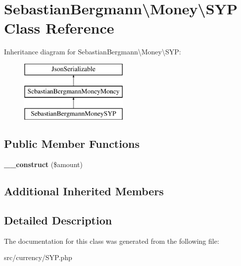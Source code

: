 \hypertarget{classSebastianBergmann_1_1Money_1_1SYP}{}\section{Sebastian\+Bergmann\textbackslash{}Money\textbackslash{}S\+Y\+P Class Reference}
\label{classSebastianBergmann_1_1Money_1_1SYP}
Inheritance diagram for Sebastian\+Bergmann\textbackslash{}Money\textbackslash{}S\+Y\+P\+:\begin{figure}[H]
\begin{center}
\leavevmode
\includegraphics[height=3.000000cm]{classSebastianBergmann_1_1Money_1_1SYP}
\end{center}
\end{figure}
\subsection*{Public Member Functions}
\begin{DoxyCompactItemize}
\item 
\hypertarget{classSebastianBergmann_1_1Money_1_1SYP_a14f6201e1a7a45c086bd21a809c0aa9c}{}{\bfseries \+\_\+\+\_\+construct} (\$amount)\label{classSebastianBergmann_1_1Money_1_1SYP_a14f6201e1a7a45c086bd21a809c0aa9c}

\end{DoxyCompactItemize}
\subsection*{Additional Inherited Members}


\subsection{Detailed Description}


The documentation for this class was generated from the following file\+:\begin{DoxyCompactItemize}
\item 
src/currency/S\+Y\+P.\+php\end{DoxyCompactItemize}
